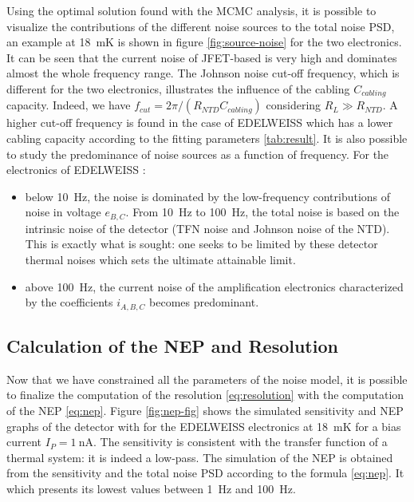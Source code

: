 Using the optimal solution found with the MCMC analysis, it is possible to visualize the contributions of the different noise sources to the total noise PSD, an example at \SI{18}{\milli\kelvin} is shown in figure \ref{fig:source-noise} for the two electronics. It can be seen that the current noise of JFET-based is very high and dominates almost the whole frequency range. The Johnson noise cut-off frequency, which is different for the two electronics, illustrates the influence of the cabling $C_{cabling}$ capacity. Indeed, we have $f_{cut} = 2\pi/(R_{NTD} C_{cabling})$ considering $R_L\gg R_{NTD}$. A higher cut-off frequency is found in the case of EDELWEISS which has a lower cabling capacity according to the fitting parameters \ref{tab:result}. It is also possible to study the predominance of noise sources as a function of frequency. For the electronics of EDELWEISS :
\begin{itemize}
\item below \SI{10}{\Hz}, the noise is dominated by the low-frequency contributions of noise in voltage $e_{B,C}$.
From \SI{10}{\Hz} to \SI{100}{\Hz}, the total noise is based on the intrinsic noise of the detector (TFN noise and Johnson noise of the NTD). This is exactly what is sought: one seeks to be limited by these detector thermal noises which sets the ultimate attainable limit.
\item above \SI{100}{\Hz}, the current noise of the amplification electronics characterized by the coefficients $i_{A,B,C}$ becomes predominant.
\end{itemize} 


\subsection{Calculation of the NEP and Resolution}
\label{nep-res}

Now that we have constrained all the parameters of the noise model, it is possible to finalize the computation of the resolution \ref{eq:resolution} with the computation of the NEP \ref{eq:nep}. Figure \ref{fig:nep-fig} shows the simulated sensitivity and NEP graphs of the detector with for the EDELWEISS electronics at \SI{18}{\milli\kelvin} for a bias current $I_P = \SI{1}{\nano\ampere}$. The sensitivity is consistent with the transfer function of a thermal system: it is indeed a low-pass. The simulation of the NEP is obtained from the sensitivity and the total noise PSD according to the formula \ref{eq:nep}. It which presents its lowest values between \SI{1}{\Hz} and \SI{100}{\Hz}. 

